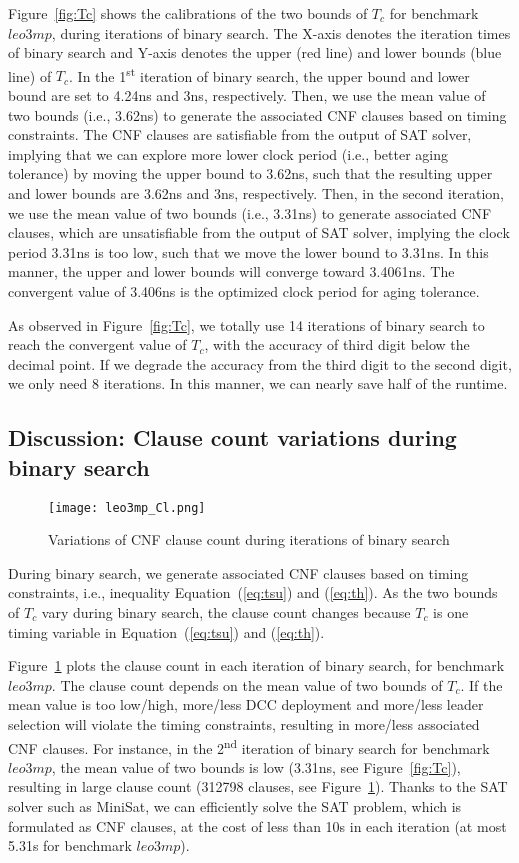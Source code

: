 Figure~\ref{fig:Tc} shows the calibrations of the two bounds of $T_{c}$ for benchmark $leo3mp$, during iterations of binary search. The X-axis denotes the iteration times of binary search and Y-axis denotes the upper (red line) and lower bounds (blue line) of $T_{c}$. In the 1\textsuperscript{st} iteration of binary search, the upper bound and lower bound are set to 4.24ns and 3ns, respectively. Then, we use the mean value of two bounds (i.e., 3.62ns) to generate the associated CNF clauses based on timing constraints. The CNF clauses are satisfiable from the output of SAT solver, implying that we can explore more lower clock period (i.e., better aging tolerance) by moving the upper bound to 3.62ns, such that the resulting upper and lower bounds are 3.62ns and 3ns, respectively. Then, in the second iteration, we use the mean value of two bounds (i.e., 3.31ns) to generate associated CNF clauses, which are unsatisfiable from the output of SAT solver, implying the clock period 3.31ns is too low, such that we move the lower bound to 3.31ns. In this manner, the upper and lower bounds will converge toward 3.4061ns. The convergent value of 3.406ns is the optimized clock period for aging tolerance.

As observed in Figure~\ref{fig:Tc}, we totally use 14 iterations of binary search to reach the convergent value of $T_{c}$, with the accuracy of third digit below the decimal point. If we degrade the accuracy from the third digit to the second digit, we only need 8 iterations. In this manner, we can nearly save half of the runtime. 


\subsection{Discussion: Clause count variations during binary search}
\begin{figure}
    \centering
    \texttt{[image: leo3mp\_Cl.png]} %
    \caption{Variations of CNF clause count during iterations of binary search}
    \label{fig:Cl}
\end{figure}

During binary search, we generate associated CNF clauses based on timing constraints, i.e., inequality Equation~(\ref{eq:tsu}) and (\ref{eq:th}). 
As the two bounds of $T_{c}$ vary during binary search, the clause count changes because $T_{c}$ is one timing variable in Equation~(\ref{eq:tsu}) and (\ref{eq:th}). 

Figure~\ref{fig:Cl} plots the clause count in each iteration of binary search, for benchmark $leo3mp$. The clause count depends on the mean value of two bounds of $T_{c}$. If the mean value is too low/high, more/less DCC deployment and more/less leader selection will violate the timing constraints, resulting in more/less associated CNF clauses. For instance, in the 2\textsuperscript{nd} iteration of binary search for benchmark $leo3mp$, the mean value of two bounds is low (3.31ns, see Figure~\ref{fig:Tc}), resulting in large clause count (312798 clauses, see Figure~\ref{fig:Cl}). Thanks to the SAT solver such as MiniSat, we can efficiently solve the SAT problem, which is formulated as CNF clauses, at the cost of less than 10s in each iteration (at most 5.31s for benchmark $leo3mp$).


